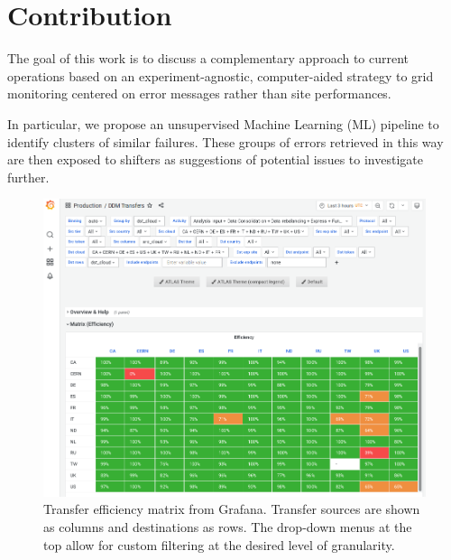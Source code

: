 \section{Contribution}
The goal of this work is to discuss a complementary approach to current operations based on an experiment-agnostic, computer-aided strategy to grid monitoring centered on error messages rather than site performances.

In particular, we propose an unsupervised Machine Learning (ML) pipeline to identify clusters of similar failures. These groups of errors retrieved in this way are then exposed to shifters as suggestions of potential issues to investigate further.

\begin{landscape}
\begin{figure}
    \centering
    \includegraphics[height=\textwidth]{figures/220_introduction/grafana_efficiency_matrix_narrow1.png}
    \caption{Transfer efficiency matrix from Grafana. Transfer sources are shown as columns and destinations as rows. The drop-down menus at the top allow for custom filtering at the desired level of granularity.}
    \label{fig:efficiency_matrix}
\end{figure}
\end{landscape}
